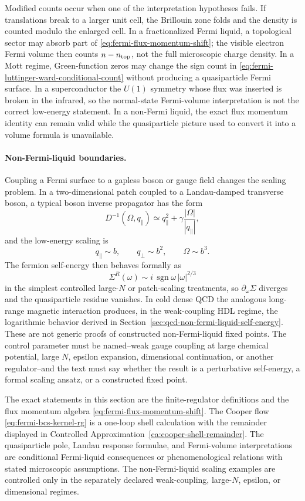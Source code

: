 Modified counts occur when one of the interpretation hypotheses fails.  If
translations break to a larger unit cell, the Brillouin zone folds and the
density is counted modulo the enlarged cell.  In a fractionalized Fermi liquid,
a topological sector may absorb part of
\eqref{eq:fermi-flux-momentum-shift}; the visible electron Fermi volume then
counts \(n-n_{\rm top}\), not the full microscopic charge density.  In a Mott
regime, Green-function zeros may change the sign count in
\eqref{eq:fermi-luttinger-ward-conditional-count} without producing a
quasiparticle Fermi surface.  In a superconductor the \(U(1)\) symmetry whose
flux was inserted is broken in the infrared, so the normal-state Fermi-volume
interpretation is not the correct low-energy statement.  In a non-Fermi liquid,
the exact flux momentum identity can remain valid while the quasiparticle
picture used to convert it into a volume formula is unavailable.

\paragraph{Non-Fermi-liquid boundaries.}
Coupling a Fermi surface to a gapless boson or gauge field changes the scaling
problem.  In a two-dimensional patch coupled to a Landau-damped transverse
boson, a typical boson inverse propagator has the form
\[
  D^{-1}(\Omega,q_\parallel)
  \simeq
  q_\parallel^2+\gamma\frac{|\Omega|}{|q_\parallel|},
\]
and the low-energy scaling is
\[
  q_\parallel\sim b,\qquad q_\perp\sim b^2,\qquad \Omega\sim b^3 .
\]
The fermion self-energy then behaves formally as
\[
  \Sigma^R(\omega)\sim
  i\,\operatorname{sgn}\omega\,|\omega|^{2/3}
\]
in the simplest controlled large-\(N\) or patch-scaling treatments, so
\(\partial_\omega\Sigma\) diverges and the quasiparticle residue vanishes.  In
cold dense QCD the analogous long-range magnetic interaction produces, in the
weak-coupling HDL regime, the logarithmic behavior derived in
Section~\ref{sec:qcd-non-fermi-liquid-self-energy}.  These are not generic
proofs of constructed non-Fermi-liquid fixed points.  The control parameter
must be named--weak gauge coupling at large chemical potential, large \(N\),
epsilon expansion, dimensional continuation, or another regulator--and the
text must say whether the result is a perturbative self-energy, a formal
scaling ansatz, or a constructed fixed point.

\begin{remark}
\label{rem:fermi-claim-statuses}
The exact statements in this section are the finite-regulator definitions and
the flux momentum algebra \eqref{eq:fermi-flux-momentum-shift}.  The Cooper
flow \eqref{eq:fermi-bcs-kernel-rg} is a one-loop shell calculation with the
remainder displayed in Controlled
Approximation~\ref{ca:cooper-shell-remainder}.  The quasiparticle pole,
Landau response formulae, and Fermi-volume interpretations are conditional
Fermi-liquid consequences or phenomenological relations with stated
microscopic assumptions.  The non-Fermi-liquid scaling examples are
controlled only in the separately declared weak-coupling, large-\(N\), epsilon,
or dimensional regimes.
\end{remark}

